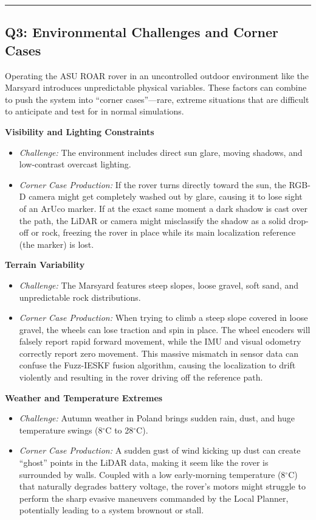 \documentclass[12pt,a4paper]{article}
\begin{document}
\vspace{0.3em}
\noindent\rule{\textwidth}{0.4pt}
\vspace{0.3em}

\subsection{Q3: Environmental Challenges and Corner Cases}

Operating the ASU ROAR rover in an uncontrolled outdoor environment like the Marsyard introduces unpredictable physical variables. These factors can combine to push the system into ``corner cases''—rare, extreme situations that are difficult to anticipate and test for in normal simulations.

\noindent\textbf{Visibility and Lighting Constraints}
\begin{itemize}[leftmargin=*]
    \item \textit{Challenge:} The environment includes direct sun glare, moving shadows, and low-contrast overcast lighting.
    \item \textit{Corner Case Production:} If the rover turns directly toward the sun, the RGB-D camera might get completely washed out by glare, causing it to lose sight of an ArUco marker. If at the exact same moment a dark shadow is cast over the path, the LiDAR or camera might misclassify the shadow as a solid drop-off or rock, freezing the rover in place while its main localization reference (the marker) is lost.
\end{itemize}

\noindent\textbf{Terrain Variability}
\begin{itemize}[leftmargin=*]
    \item \textit{Challenge:} The Marsyard features steep slopes, loose gravel, soft sand, and unpredictable rock distributions.
    \item \textit{Corner Case Production:} When trying to climb a steep slope covered in loose gravel, the wheels can lose traction and spin in place. The wheel encoders will falsely report rapid forward movement, while the IMU and visual odometry correctly report zero movement. This massive mismatch in sensor data can confuse the Fuzz-IESKF fusion algorithm, causing the localization to drift violently and resulting in the rover driving off the reference path.
\end{itemize}

\noindent\textbf{Weather and Temperature Extremes}
\begin{itemize}[leftmargin=*]
    \item \textit{Challenge:} Autumn weather in Poland brings sudden rain, dust, and huge temperature swings (8$^\circ$C to 28$^\circ$C).
    \item \textit{Corner Case Production:} A sudden gust of wind kicking up dust can create ``ghost'' points in the LiDAR data, making it seem like the rover is surrounded by walls. Coupled with a low early-morning temperature (8$^\circ$C) that naturally degrades battery voltage, the rover's motors might struggle to perform the sharp evasive maneuvers commanded by the Local Planner, potentially leading to a system brownout or stall.
\end{itemize}
\end{document}
